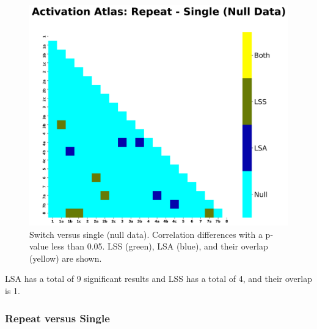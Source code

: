 \documentclass[10pt,letterpaper]{article}
\begin{document}
\begin{figure}[H]
  \centering
  \includegraphics[width=\textwidth]{data-null_atlas-activation_contrast-repeatXsingle}
  \caption{
    Switch versus single (null data). Correlation differences with a p-value less than 0.05.
    LSS (green), LSA (blue), and their overlap (yellow) are shown.
  }
  \label{fig:restswitchvsingle}
\end{figure}

LSA has a total of 9 significant results and LSS has a total of 4,
and their overlap is 1.

\subsubsection*{Repeat versus Single}
\label{results:bsc-repeatXsingle}
\end{document}
